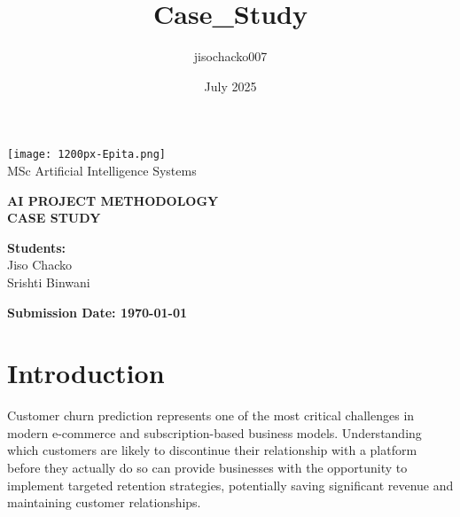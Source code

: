 \documentclass{article}
\title{Case_Study}
\author{jisochacko007 }
\date{July 2025}
\begin{document}
\begin{titlepage}
    \centering
    
    \vspace*{0.5cm}
    \texttt{[image: 1200px-Epita.png]}\\[0.5cm]
    
    {\large MSc Artificial Intelligence Systems}\\[1.5cm]
    
    \parbox{1\textwidth}{
        \centering
        {\Huge \textbf{AI PROJECT METHODOLOGY}}\\[0.5cm]
        {\Huge \textbf{CASE STUDY}}\\[1cm]
    }
    
    \vfill %
    
    \begin{minipage}{\textwidth}
        \hfill %
        \begin{minipage}{0.2\textwidth}
            \raggedright %
            \textbf{Students:}\\[0.5cm]
            Jiso Chacko\\
            Srishti Binwani
        \end{minipage}
    \end{minipage}
    
    \vspace{1cm}
    
    \begin{center}
        {\large \textbf{Submission Date: \today}}
    \end{center}
    
    \restoregeometry
\end{titlepage}

\tableofcontents
\newpage

\section{Introduction}

Customer churn prediction represents one of the most critical challenges in modern e-commerce and subscription-based business models. Understanding which customers are likely to discontinue their relationship with a platform before they actually do so can provide businesses with the opportunity to implement targeted retention strategies, potentially saving significant revenue and maintaining customer relationships.
\end{document}
